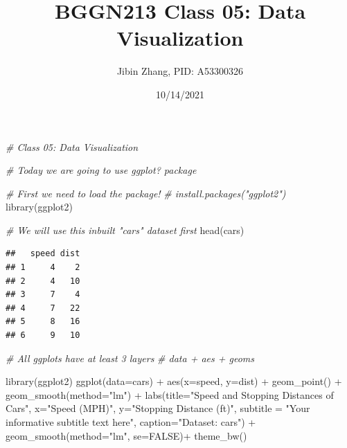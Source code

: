 \documentclass[
]{article}
\title{BGGN213 Class 05: Data Visualization}
\author{Jibin Zhang, PID: A53300326}
\date{10/14/2021}
\newenvironment{Shaded}{\begin{snugshade}}{\end{snugshade}}
\newcommand{\AttributeTok}[1]{\textcolor[rgb]{0.77,0.63,0.00}{#1}}
\newcommand{\CommentTok}[1]{\textcolor[rgb]{0.56,0.35,0.01}{\textit{#1}}}
\newcommand{\ConstantTok}[1]{\textcolor[rgb]{0.00,0.00,0.00}{#1}}
\newcommand{\FunctionTok}[1]{\textcolor[rgb]{0.00,0.00,0.00}{#1}}
\newcommand{\NormalTok}[1]{#1}
\newcommand{\SpecialCharTok}[1]{\textcolor[rgb]{0.00,0.00,0.00}{#1}}
\newcommand{\StringTok}[1]{\textcolor[rgb]{0.31,0.60,0.02}{#1}}
\begin{document}
\maketitle

\begin{Shaded}
\begin{Highlighting}[]
\CommentTok{\# Class 05: Data Visualization}

\CommentTok{\# Today we are going to use ggplot? package}

\CommentTok{\# First we need to load the package!}
\CommentTok{\# install.packages("ggplot2")}
\FunctionTok{library}\NormalTok{(ggplot2)}

\CommentTok{\# We will use this inbuilt "cars" dataset first}
\FunctionTok{head}\NormalTok{(cars)}
\end{Highlighting}
\end{Shaded}

\begin{verbatim}
##   speed dist
## 1     4    2
## 2     4   10
## 3     7    4
## 4     7   22
## 5     8   16
## 6     9   10
\end{verbatim}

\begin{Shaded}
\begin{Highlighting}[]
\CommentTok{\# All ggplots have at least 3 layers}
\CommentTok{\# data + aes + geoms}

\FunctionTok{library}\NormalTok{(ggplot2)}
\FunctionTok{ggplot}\NormalTok{(}\AttributeTok{data=}\NormalTok{cars) }\SpecialCharTok{+} 
  \FunctionTok{aes}\NormalTok{(}\AttributeTok{x=}\NormalTok{speed, }\AttributeTok{y=}\NormalTok{dist) }\SpecialCharTok{+}
  \FunctionTok{geom\_point}\NormalTok{() }\SpecialCharTok{+}
  \FunctionTok{geom\_smooth}\NormalTok{(}\AttributeTok{method=}\StringTok{"lm"}\NormalTok{) }\SpecialCharTok{+}
  \FunctionTok{labs}\NormalTok{(}\AttributeTok{title=}\StringTok{"Speed and Stopping Distances of Cars"}\NormalTok{,}
       \AttributeTok{x=}\StringTok{"Speed (MPH)"}\NormalTok{,}
       \AttributeTok{y=}\StringTok{"Stopping Distance (ft)"}\NormalTok{,}
       \AttributeTok{subtitle =} \StringTok{"Your informative subtitle text here"}\NormalTok{,}
       \AttributeTok{caption=}\StringTok{"Dataset: \textquotesingle{}cars\textquotesingle{}"}\NormalTok{) }\SpecialCharTok{+}
  \FunctionTok{geom\_smooth}\NormalTok{(}\AttributeTok{method=}\StringTok{"lm"}\NormalTok{, }\AttributeTok{se=}\ConstantTok{FALSE}\NormalTok{)}\SpecialCharTok{+}
  \FunctionTok{theme\_bw}\NormalTok{()}
\end{Highlighting}
\end{Shaded}
\end{document}
